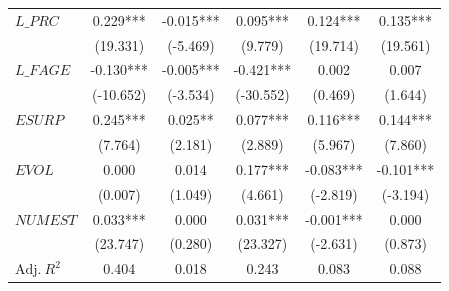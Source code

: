 \documentclass[
  12pt,
  a4paper,
  twoside,
  onecolumn]{article}
\begin{document}
\begin{spacing}{1.0}
\begin{table}
\begin{tabularx}{\linewidth}{X * {5}{S[table-format=4.3]}}
\addlinespace
$L\_PRC$ & 0.229*** & -0.015*** & 0.095*** & 0.124*** & 0.135***\\
 & (19.331) & (-5.469) & (9.779) & (19.714) & (19.561)\\
\addlinespace
$L\_FAGE$ & -0.130*** & -0.005*** & -0.421*** & 0.002 & 0.007\\
 & (-10.652) & (-3.534) & (-30.552) & (0.469) & (1.644)\\
\addlinespace
$ESURP$ & 0.245*** & 0.025** & 0.077*** & 0.116*** & 0.144***\\
 & (7.764) & (2.181) & (2.889) & (5.967) & (7.860)\\
\addlinespace
$EVOL$ & 0.000 & 0.014 & 0.177*** & -0.083*** & -0.101***\\
 & (0.007) & (1.049) & (4.661) & (-2.819) & (-3.194)\\
\addlinespace
$NUMEST$ & 0.033*** & 0.000 & 0.031*** & -0.001*** & 0.000\\
 & (23.747) & (0.280) & (23.327) & (-2.631) & (0.873)\\
\midrule
$\textrm{Adj.} \: R^2$ & 0.404 & 0.018 & 0.243 & 0.083 & 0.088\\
\bottomrule
\end{tabularx}

\end{table}
\end{spacing}
 \clearpage
\end{document}
